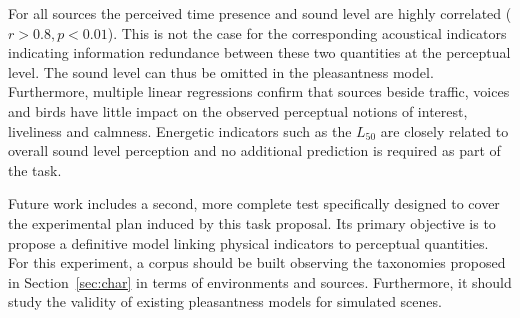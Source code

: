 \documentclass{article}
\begin{document}
\begin{sloppy}
For all sources the perceived time presence and sound level are highly correlated ($r>0.8, p<0.01$). This is not the case for the corresponding acoustical indicators indicating information redundance between these two quantities at the perceptual level. The sound level can thus be omitted in the pleasantness model. Furthermore, multiple linear regressions confirm that sources beside traffic, voices and birds have little impact on the observed perceptual notions of interest, liveliness and calmness. Energetic indicators such as the $L_{50}$ are closely related to overall sound level perception and no additional prediction is required as part of the task.

Future work includes a second, more complete test specifically designed to cover the experimental plan induced by this task proposal. Its primary objective is to propose a definitive model linking physical indicators to perceptual quantities. For this experiment, a corpus should be built observing the taxonomies proposed in Section~\ref{sec:char} in terms of environments and sources. Furthermore, it should study the validity of existing pleasantness models for simulated scenes.





%
% 
%
%
%
% 
%
% 
% 


\end{sloppy}
\end{document}
